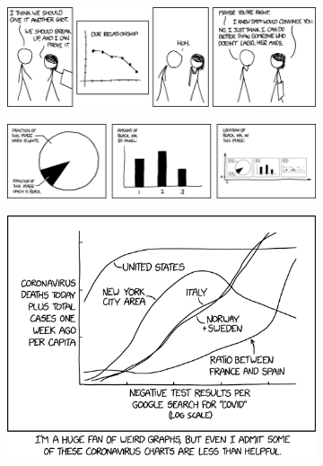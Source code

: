\begin{figure}
\centering
\begin{subfigure}{.49\textwidth}
\centering
\includegraphics[width=\textwidth]{xkcd_convincing.png}
\end{subfigure}
\hfill
\begin{subfigure}{.49\textwidth}
\centering
  \includegraphics[width=\textwidth]{xkcd_self_description.png} 
\end{subfigure}
\hfill
\begin{subfigure}{.49\textwidth}
\centering
  \includegraphics[width=\textwidth]{xkcd_coronavirus_charts.png}
\end{subfigure}
\hfill
\begin{subfigure}{.49\textwidth}

\end{subfigure}
\end{figure}

